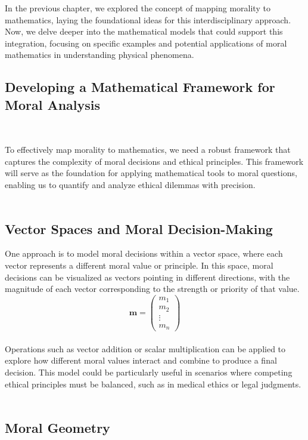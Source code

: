 \documentclass{article}
\begin{document}
In the previous chapter, we explored the concept of mapping morality to mathematics, laying the foundational ideas for this interdisciplinary approach. Now, we delve deeper into the mathematical models that could support this integration, focusing on specific examples and potential applications of moral mathematics in understanding physical phenomena.

\subsection{Developing a Mathematical Framework for Moral Analysis}
\

To effectively map morality to mathematics, we need a robust framework that captures the complexity of moral decisions and ethical principles. This framework will serve as the foundation for applying mathematical tools to moral questions, enabling us to quantify and analyze ethical dilemmas with precision.
\\
\\

\subsection{Vector Spaces and Moral Decision-Making}

One approach is to model moral decisions within a vector space, where each vector represents a different moral value or principle. In this space, moral decisions can be visualized as vectors pointing in different directions, with the magnitude of each vector corresponding to the strength or priority of that value.
\\

\[
\mathbf{m} = \begin{pmatrix}
m_1 \\
m_2 \\
\vdots \\
m_n
\end{pmatrix}
\]
\\

Operations such as vector addition or scalar multiplication can be applied to explore how different moral values interact and combine to produce a final decision. This model could be particularly useful in scenarios where competing ethical principles must be balanced, such as in medical ethics or legal judgments.
\\
\\

\subsection{Moral Geometry}
\end{document}
